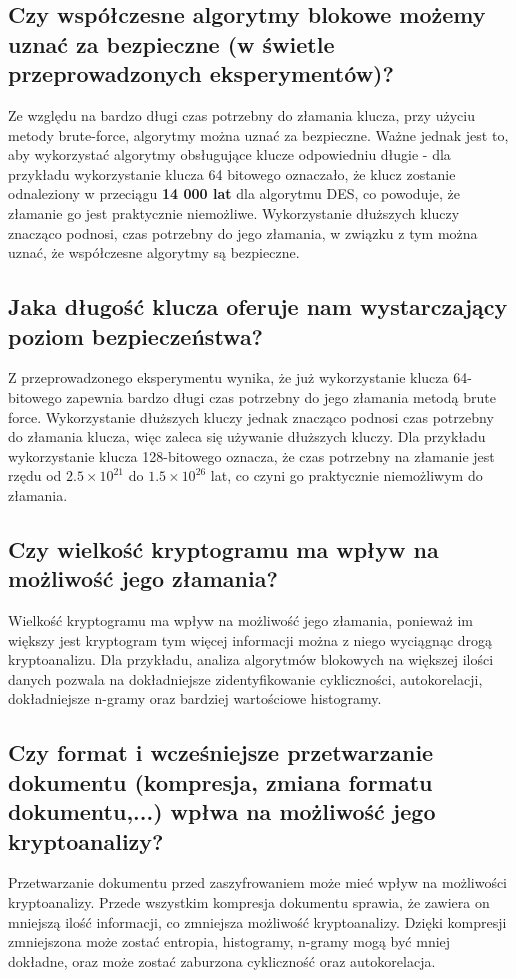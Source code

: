 \documentclass{article}
\begin{document}
\subsection{Czy współczesne algorytmy blokowe możemy uznać za bezpieczne (w świetle przeprowadzonych eksperymentów)?}
Ze względu na bardzo długi czas potrzebny do złamania klucza, przy użyciu metody brute-force, algorytmy można uznać za bezpieczne.
Ważne jednak jest to, aby wykorzystać algorytmy obsługujące klucze odpowiedniu długie - dla przykładu wykorzystanie klucza 64 bitowego oznaczało, że
klucz zostanie odnaleziony w przeciągu \textbf{14 000 lat} dla algorytmu DES, co powoduje, że złamanie go jest praktycznie niemożliwe. Wykorzystanie dłuższych kluczy znacząco podnosi, czas potrzebny
do jego złamania, w związku z tym można uznać, że współczesne algorytmy są bezpieczne.

\subsection{Jaka długość klucza oferuje nam wystarczający poziom bezpieczeństwa?}
Z przeprowadzonego eksperymentu wynika, że już wykorzystanie klucza 64-bitowego zapewnia bardzo długi czas potrzebny do jego złamania metodą brute force.
Wykorzystanie dłuższych kluczy jednak znacząco podnosi czas potrzebny do złamania klucza, więc zaleca się używanie dłuższych kluczy. Dla przykładu wykorzystanie klucza 128-bitowego
oznacza, że czas potrzebny na złamanie jest rzędu od \(2.5 \times 10^{21}\) do \(1.5 \times 10^{26}\) lat, co czyni go praktycznie niemożliwym do złamania.

\subsection{Czy wielkość kryptogramu ma wpływ na możliwość jego złamania?}
Wielkość kryptogramu ma wpływ na możliwość jego złamania, ponieważ im większy jest kryptogram tym więcej informacji można z niego wyciągnąc drogą kryptoanalizu.
Dla przykładu, analiza algorytmów blokowych na większej ilości danych pozwala na dokładniejsze zidentyfikowanie cykliczności, autokorelacji, dokładniejsze n-gramy oraz bardziej wartościowe histogramy.

\subsection{Czy format i wcześniejsze przetwarzanie dokumentu (kompresja, zmiana formatu dokumentu,...) wpłwa na możliwość jego kryptoanalizy?}
Przetwarzanie dokumentu przed zaszyfrowaniem może mieć wpływ na możliwości kryptoanalizy.
Przede wszystkim kompresja dokumentu sprawia, że zawiera on mniejszą ilość informacji, co zmniejsza możliwość kryptoanalizy. Dzięki kompresji zmniejszona może zostać entropia,
histogramy, n-gramy mogą być mniej dokładne, oraz może zostać zaburzona cykliczność oraz autokorelacja.
\end{document}
